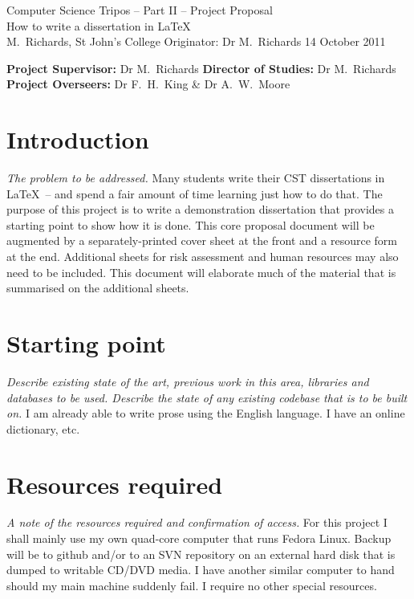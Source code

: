 \documentclass[12pt,a4paper,twoside]{article}
\begin{document}
\begin{center}
\Large
Computer Science Tripos -- Part II -- Project Proposal\\[4mm]
\LARGE
How to write a dissertation in \LaTeX\\[4mm]
\large
M.~Richards, St John's College
Originator: Dr M.~Richards
14 October 2011
\end{center}
\vspace{5mm}
\textbf{Project Supervisor:} Dr M.~Richards
\textbf{Director of Studies:} Dr M.~Richards
\textbf{Project Overseers:} Dr F.~H.~King \& Dr A.~W.~Moore
\section*{Introduction}
\emph{The problem to be addressed.}
Many students write their CST dissertations in \LaTeX\ -- and spend a
fair amount of time learning just how to do that. The purpose of this
project is to write a demonstration dissertation that provides
a starting point to show how it is done.
This core proposal document will be augmented by a separately-printed
cover sheet at the front and a resource form at the end. Additional
sheets for risk assessment and human resources may also need to be
included.
This document will elaborate much of the material that is summarised on
the additional sheets.
\section*{Starting point}
\emph{Describe existing state of the art, previous work in this area,
libraries and databases to be used. Describe the state of any
existing codebase that is to be built on.}
I am already able to write prose using the English language. I have an
online dictionary, etc.
\section*{Resources required}
\emph{A note of the resources required and confirmation of access.}
For this project I shall mainly use my own quad-core computer that
runs Fedora Linux. Backup will be to github and/or to an SVN
repository on an external hard disk that is dumped to writable CD/DVD
media. I have another similar computer to hand should my main machine
suddenly fail. I require no other special resources.
\end{document}

